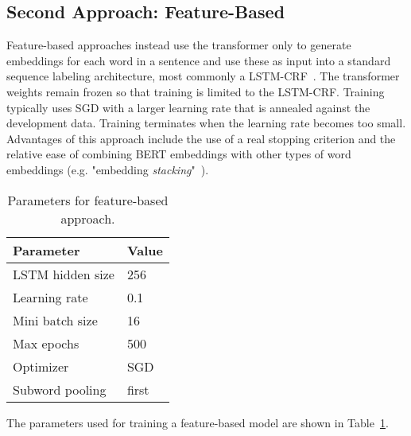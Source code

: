 \documentclass[11pt,a4paper]{article}
\begin{document}
\subsection{Second Approach: Feature-Based}
\label{sec:feature_based}

Feature-based approaches instead use the transformer only to generate embeddings for each word in a sentence and use these as input into a standard sequence labeling architecture, most commonly a LSTM-CRF~\cite{2015arXiv150801991H}. The transformer weights remain frozen so that training is limited to the LSTM-CRF. Training typically uses SGD with a larger learning rate that is annealed against the development data. Training terminates when the learning rate becomes too small. Advantages of this approach include the use of a real stopping criterion and the relative ease of combining BERT embeddings with other types of word embeddings (e.g. "embedding \textit{stacking}"~\cite{akbik-etal-2019-flair}). 

\begin{table}[h!]
\begin{center}
\begin{tabular}{ l l }
\toprule
Parameter & Value \\
\midrule
LSTM hidden size & 256 \\
Learning rate & 0.1 \\
Mini batch size & 16 \\
Max epochs & 500 \\
Optimizer & SGD \\
Subword pooling & first \\
\bottomrule
\end{tabular}
\end{center}
\caption{\label{ner-training-parameters-feature-based} Parameters for feature-based approach.}
\end{table}

The parameters used for training a feature-based model are shown in Table~\ref{ner-training-parameters-feature-based}. 
\end{document}
